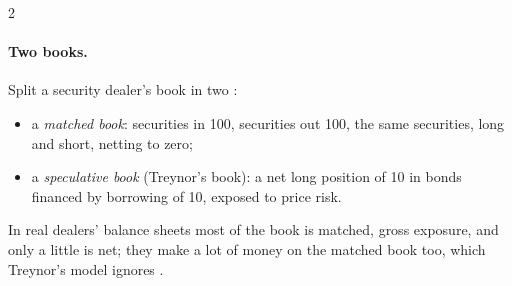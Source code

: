 \begin{paracol}{2}
\paragraph{Two books.} Split a security dealer's book in two :
\begin{itemize}
  \item a \emph{matched book}: securities in 100, securities out 100, the same securities, long and short, netting to zero;
  \item a \emph{speculative book} (Treynor's book): a net long position of 10 in bonds financed by borrowing of 10, exposed to price risk.
\end{itemize}
In real dealers' balance sheets most of the book is matched, gross exposure, and only a little is net; they make a lot of money on the matched book too, which Treynor's model
ignores .


\end{paracol}
